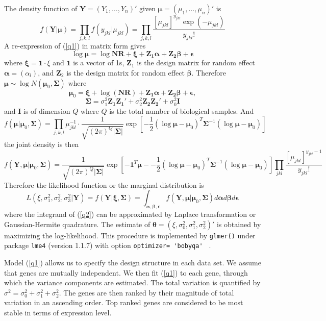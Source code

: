 \documentclass[11pt, a4paper]{article}
\begin{document}
  The density function of $\bm Y=(Y_1, \ldots, Y_n)'$ given $\bm \mu= (\mu_1, \ldots, \mu_n)'$ is 
  \[f(\bm Y|\bm \mu )=\prod_{ j, k,l}f(y_{jkl}|\mu_{jkl})=\prod_{j,k,l}\frac{[\mu_{jkl}]^{y_{jkl}}\exp(-\mu_{jkl})}{y_{jkl}!}\]
A re-expression of  (\ref{q1}) in matrix form gives 
\[\log\bm \mu=\log{\bm{NR}} + \bm \xi + \bm {Z_1\alpha} + \bm{Z_2\beta} + \bm \epsilon \]
where $\bm \xi = \bm 1\cdot\xi$ and $\bm 1$ is a vector of 1s, $\bm Z_1$ is the design matrix for random effect $\bm \alpha=(\alpha_l)$, and $\bm Z_2$ is the design matrix for random effect $\bm \beta $. 
Therefore  $\bm\mu  \sim \log N(\bm \mu_0, \bm \Sigma)$ where 
$$\bm \mu_0 =\bm\xi + \log(\bm {NR})+ \bm {Z_1\alpha} + \bm{Z_2\beta} + \bm \epsilon,$$ 
$$\bm \Sigma = \sigma_1^2\bm {Z_1Z_1'} + \sigma_2^2\bm {Z_2 Z_2'} +\sigma_0^2 \bm I$$
 and $\bm I$ is of dimension $Q$ where $Q$ is the total number of biological samples. 
 And 
 \[f(\bm \mu |\bm \mu_0, \bm \Sigma)=\prod_{j,k,l} \mu_{jkl}^{-1}\cdot \frac{1}{ \sqrt{(2\pi)^Q|\bm\Sigma|}}\exp[-\frac{1}{2} {(\log\bm \mu - \bm \mu_0)^T\bm \Sigma^{-1}(\log\bm \mu - \bm \mu_0)}]\]
 the joint density is then
  \[f(\bm Y, \bm \mu |\bm \mu_0, \bm \Sigma) =\frac{1}{\sqrt{(2\pi)^Q|\bm \Sigma|}}\exp[-\bm 1^T\bm \mu - -\frac{1}{2} {(\log\bm \mu - \bm \mu_0)^T\bm \Sigma^{-1}(\log\bm \mu - \bm \mu_0)}]\prod_{jkl}\frac{[\mu_{jkl}]^{y_{jkl}-1}}{y_{jkl}!}\]
   Therefore the likelihood function or the marginal distribution is 
   \begin{equation}\label{q2}
   L(\xi, \sigma_1^2, \sigma_2^2, \sigma_3^2|\bm Y)=f(\bm Y|\bm \xi, \bm \Sigma)= \int_{\bm{\alpha,\beta,\epsilon}} f(\bm Y, \bm \mu |\bm \mu_0, \bm \Sigma)d\bm \alpha d \bm\beta d\bm \epsilon 
   \end{equation}
where the integrand of (\ref{q2}) can be approximated by Laplace transformation or Gaussian-Hermite quadrature\citep{mcculloch2001generalized}. The estimate of $\bm\theta = (\xi, \sigma_0^2, \sigma_1^2, \sigma_2^2)'$ is obtained by maximizing the log-likelihood. This procedure is implemented by \verb"glmer()"  under package \verb"lme4" (version 1.1.7)  with option  \verb"optimizer= 'bobyqa' " \citep{bates2012lme4}.
 
 Model (\ref{q1}) allows us to specify the design structure in each data set. We assume that genes are mutually independent. We then fit (\ref{q1}) to each gene, through which the variance components are estimated.  The total variation is quantified by $\sigma^2 = \sigma^2_0 + \sigma_1^2 + \sigma_2^2$. The genes are then ranked by their magnitude of total variation in an ascending order. Top ranked genes are considered to be most stable in terms of expression level. 
  
\end{document}

